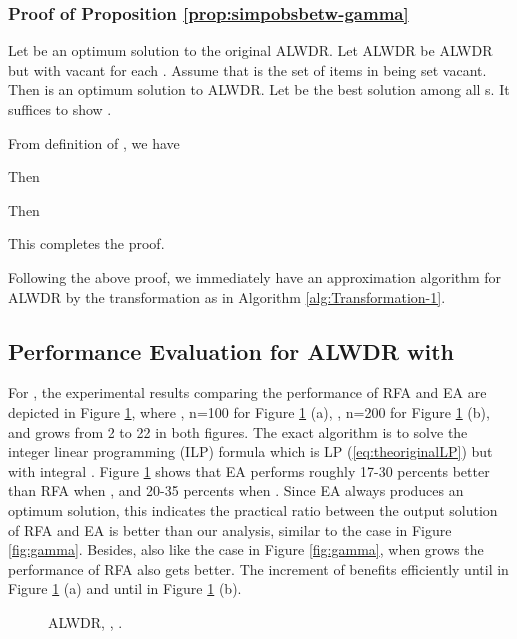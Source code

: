 \documentclass[11pt,english,onecolumn,draftcls]{IEEEtran}
\theoremstyle{plain}
\theoremstyle{plain}
\theoremstyle{plain}
\theoremstyle{plain}
\begin{document}
\subsubsection*{Proof of Proposition \ref{prop:simpobsbetw-gamma}}
\begin{IEEEproof}
Let  be an optimum solution to the original ALWDR.
Let ALWDR be ALWDR but with 
vacant for each .
Assume that  is the set of items in  being set vacant.
Then  is an optimum solution to ALWDR.
Let  be the best solution among all s. It
suffices to show .

From definition of , we have

Then

Then

This completes the proof.
\end{IEEEproof}
Following the above proof, we immediately have an approximation algorithm
for ALWDR by the transformation as in Algorithm \ref{alg:Transformation-1}.


\subsection*{Performance Evaluation for \textmd{\normalsize{}ALWDR} with
}

For , the experimental results comparing the performance
of RFA and EA are depicted in Figure \ref{fig:lpvsilp}, where ,
n=100 for Figure \ref{fig:lpvsilp} (a), , n=200 for Figure
\ref{fig:lpvsilp} (b), and  grows from 2 to 22 in both figures.
The exact algorithm is to solve the integer linear programming (ILP)
formula which is LP (\ref{eq:theoriginalLP}) but with integral .
Figure \ref{fig:lpvsilp} shows that EA performs roughly 17-30 percents
better than RFA when , and 20-35 percents when . Since
EA always produces an optimum solution, this indicates the practical
ratio between the output solution of RFA and EA is better than our
analysis, similar to the case in Figure \ref{fig:gamma}. Besides,
also like the case in Figure \ref{fig:gamma}, when  grows
the performance of RFA also gets better. The increment of 
benefits efficiently until  in Figure \ref{fig:lpvsilp}
(a) and until  in Figure \ref{fig:lpvsilp} (b).

\begin{figure}
 

\protect\caption{\label{fig:lpvsilp}ALWDR, , . }
\end{figure}
\end{document}

